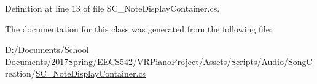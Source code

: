 Definition at line 13 of file S\+C\+\_\+\+Note\+Display\+Container.\+cs.



The documentation for this class was generated from the following file\+:\begin{DoxyCompactItemize}
\item 
D\+:/\+Documents/\+School Documents/2017\+Spring/\+E\+E\+C\+S542/\+V\+R\+Piano\+Project/\+Assets/\+Scripts/\+Audio/\+Song\+Creation/\hyperlink{_s_c___note_display_container_8cs}{S\+C\+\_\+\+Note\+Display\+Container.\+cs}\end{DoxyCompactItemize}
